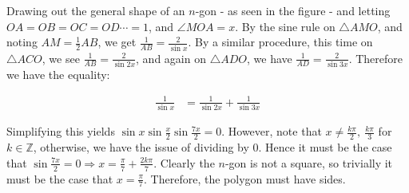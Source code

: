 \begin{solution}\hfil\medskip

    Drawing out the general shape of an \(n\)-gon - as seen in the figure - and letting \(OA=OB=OC=OD\cdots=1\), and \(\angle MOA=x\). By the sine rule on \(\triangle AMO\), and noting \(AM=\frac{1}{2}AB\), we get \(\frac{1}{AB}=\frac{2}{\sin x}\). By a similar procedure, this time on \(\triangle ACO\), we see \(\frac{1}{AB}=\frac{2}{\sin 2x}\), and again on \(\triangle ADO\), we have \(\frac{1}{AD}=\frac{2}{\sin3x}\). Therefore we have the equality: 
    
    \begin{align*}
        \frac{1}{\sin x}&=\frac{1}{\sin2x}+\frac{1}{\sin3x}
    \end{align*}

    Simplifying this yields \(\sin x\sin\frac{x}{2}\sin\frac{7x}{2}=0\). However, note that \(x\ne\frac{k\pi}{2},\ \frac{k\pi}{3}\) for \(k\in\mathbb{Z}\), otherwise, we have the issue of dividing by 0. Hence it must be the case that \(\sin\frac{7x}{2}=0\Rightarrow x=\frac{\pi}{7}+\frac{2k\pi}{7}\). Clearly the \(n\)-gon is not a square, so trivially it must be the case that \(x=\frac{\pi}{7}\). Therefore, the polygon must have  sides.
    

\end{solution}
